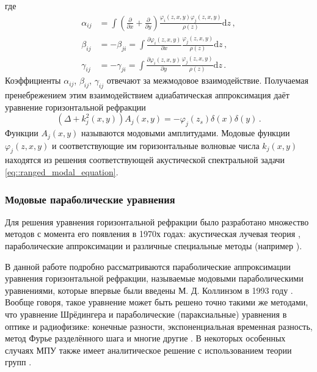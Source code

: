\documentclass{fefu}
\newcommand{\pa}[1]{\left(#1\right)}
\begin{document}
                    где
                    \begin{equation}
                        \begin{aligned}
                            \alpha_{ij}&=\int\pa{\frac{\partial}{\partial x}+\frac{\partial}{\partial y}}\frac{\varphi_i\pa{z,x,y}\varphi_j\pa{z,x,y}}{\rho\pa{z}}\text{d}z\,,\\
                            \beta_{ij}&=-\beta_{ji}=\int\frac{\partial\varphi_i\pa{z,x,y}}{\partial x}\frac{\varphi_j\pa{z,x,y}}{\rho\pa{z}}\text{d}z\,,\\
                            \gamma_{ij}&=-\gamma_{ji}=\int\frac{\partial\varphi_i\pa{z,x,y}}{\partial y}\frac{\varphi_j\pa{z,x,y}}{\rho\pa{z}}\text{d}z\,.
                        \end{aligned}
                    \end{equation}
                    Коэффициенты $\alpha_{ij}$, $\beta_{ij}$, $\gamma_{ij}$ отвечают за межмодовое взаимодействие. Получаемая пренебрежением этим взаимодействием адиабатическая аппроксимация даёт уравнение горизонтальной рефракции
                    \begin{equation}\label{eq::HRE}
                        \pa{\Delta+k_j^2\pa{x,y}}A_j\pa{x,y}=-\varphi_j\pa{z_s}\delta\pa{x}\delta\pa{y}\,.
                    \end{equation}
                    Функции $A_j\pa{x,y}$ называются модовыми амплитудами. Модовые функции\\ $\varphi_j\pa{z,x,y}$ и соответствующие им горизонтальные волновые числа $k_j\pa{x,y}$ находятся из решения соответствующей акустической спектральной задачи \eqref{eq::ranged_modal_equation}.
            \subsubsection{Модовые параболические уравнения}
                \par Для решения уравнения горизонтальной рефракции было разработано множество методов с момента его появления в 1970х годах: акустическая лучевая теория \cite{burridge}, параболические аппроксимации \cite{collins} и различные специальные методы (например \cite{petrov14}).
                \par В данной работе подробно рассматриваются параболические аппроксимации уравнения горизонтальной рефракции, называемые модовыми параболическими уравнениями, которые впервые были введены М. Д. Коллинзом в 1993 году \cite{collins}. Вообще говоря, такое уравнение может быть решено точно такими же методами, что уравнение Шрёдингера и параболические (параксиальные) уравнения в оптике и радиофизике: конечные разности, экспоненциальная временная разность, метод Фурье разделённого шага и многие другие \cite{jensen}. В некоторых особенных случаях МПУ также имеет аналитическое решение с использованием теории групп \cite{petrov16, petrov17}. 
\end{document}
